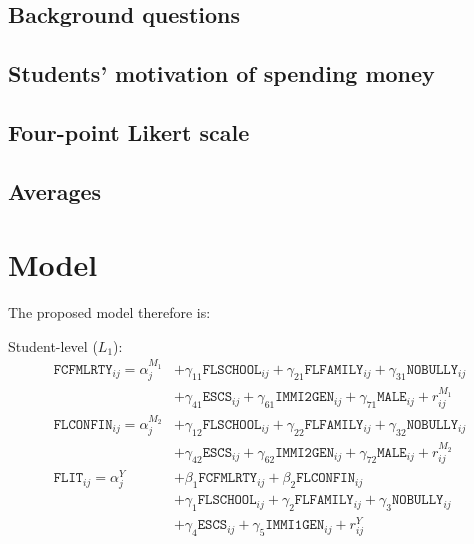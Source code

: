\documentclass[a4paper,11pt,UKenglish,twoside,openright]{report}\usepackage[]{graphicx}\usepackage[]{color}
\begin{document}
\subsection{Background questions}

\subsection{Students' motivation of spending money}

\subsection{Four-point Likert scale}

\subsection{Averages}

\newpage

\section{Model}

The proposed model therefore is:

\newpage

Student-level ($L_1$):
\begin{equation}
    \begin{aligned}
        \texttt{FCFMLRTY}_{ij} = \alpha^{M_1}_{j} &+ \gamma_{11}\texttt{FLSCHOOL}_{ij} + \gamma_{21}\texttt{FLFAMILY}_{ij} + \gamma_{31}\texttt{NOBULLY}_{ij}\\
        &+ \gamma_{41}\texttt{ESCS}_{ij} + \gamma_{61}\texttt{IMMI2GEN}_{ij} + \gamma_{71}\texttt{MALE}_{ij} + r^{M_1}_{ij}\\
        \texttt{FLCONFIN}_{ij} = \alpha^{M_2}_{j} &+ \gamma_{12}\texttt{FLSCHOOL}_{ij} + \gamma_{22}\texttt{FLFAMILY}_{ij} + \gamma_{32}\texttt{NOBULLY}_{ij}\\
        &+ \gamma_{42}\texttt{ESCS}_{ij} + \gamma_{62}\texttt{IMMI2GEN}_{ij} + \gamma_{72}\texttt{MALE}_{ij} + r^{M_2}_{ij}\\
        \texttt{FLIT}_{ij} = \alpha^{Y}_{j} &+ \beta_1\texttt{FCFMLRTY}_{ij} + \beta_2\texttt{FLCONFIN}_{ij}\\
        &+ \gamma_1\texttt{FLSCHOOL}_{ij} + \gamma_2\texttt{FLFAMILY}_{ij}+ \gamma_3\texttt{NOBULLY}_{ij} \\
        &+ \gamma_4\texttt{ESCS}_{ij} + \gamma_5\texttt{IMMI1GEN}_{ij} + r^{Y}_{ij}
    \end{aligned}
\end{equation}
\end{document}
